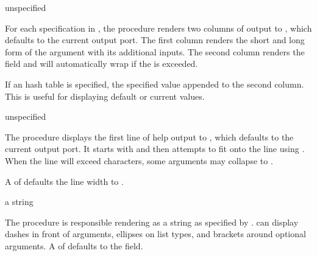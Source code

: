\begin{procedure}
\end{procedure}
\returns{} unspecified

For each specification in , the 
procedure renders two columns of output to , which defaults to
the current output port. The first column renders the short and long
form of the argument with its additional inputs. The second column
renders the   field and will automatically
wrap if the  is exceeded.

If an  hash table is specified, the specified value appended
to the second column. This is useful for displaying default or current
values.

\begin{procedure}
\end{procedure}
\returns{} unspecified

The  procedure displays the first line of help
output to , which defaults to the current output port. It
starts with  and  then attempts to fit
 onto the line using . When the line will
exceed  characters, some arguments may collapse to
\code{[options]}.

A  of  defaults the line width to
.

\begin{procedure}
\end{procedure}
\returns{} a string

The  procedure is responsible rendering 
as a string as specified by .   can display
dashes in front of arguments, ellipses on list types, and brackets
around optional arguments. A  of  defaults to the
  field.

